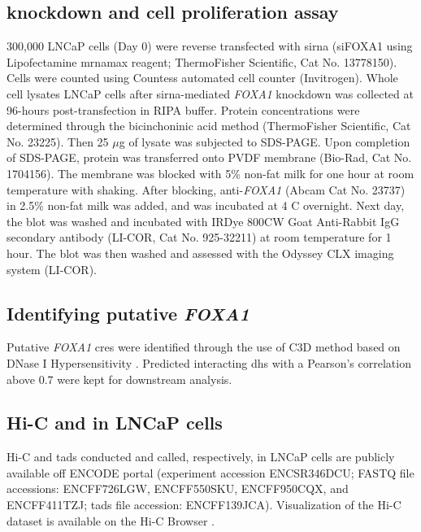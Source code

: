 \subsection{ knockdown and cell proliferation assay}

300,000 LNCaP cells (Day 0) were reverse transfected with \gls{sirna} (siFOXA1 using Lipofectamine \gls{mrna}max reagent; ThermoFisher Scientific, Cat No. 13778150).
Cells were counted using Countess automated cell counter (Invitrogen).
Whole cell lysates LNCaP cells after \gls{sirna}-mediated \emph{FOXA1} knockdown was collected at 96-hours post-transfection in RIPA buffer.
Protein concentrations were determined through the bicinchoninic acid method (ThermoFisher Scientific, Cat No. 23225).
Then 25 $\mu$g of lysate was subjected to SDS-PAGE.
Upon completion of SDS-PAGE, protein was transferred onto PVDF membrane (Bio-Rad, Cat No. 1704156).
The membrane was blocked with 5\% non-fat milk for one hour at room temperature with shaking.
After blocking, anti-\emph{FOXA1} (Abcam Cat No. 23737) in 2.5\% non-fat milk was added, and was incubated at 4 \textdegree C overnight.
Next day, the blot was washed and incubated with IRDye 800CW Goat Anti-Rabbit IgG secondary antibody (LI-COR, Cat No. 925-32211) at room temperature for 1 hour.
The blot was then washed and assessed with the Odyssey CLX imaging system (LI-COR).

\subsection{Identifying putative \emph{FOXA1} }

Putative \emph{FOXA1} \glspl{cre} were identified through the use of C3D method based on DNase I Hypersensitivity \cite{mehdiC3DToolPredict2019}.
Predicted interacting \gls{dhs} with a Pearson's correlation above 0.7 \cite{thurmanAccessibleChromatinLandscape2012} were kept for downstream analysis.

\subsection{Hi-C and  in LNCaP cells}

Hi-C and \glspl{tad} conducted and called, respectively, in LNCaP cells are publicly available off ENCODE portal (experiment accession ENCSR346DCU; FASTQ file accessions: ENCFF726LGW, ENCFF550SKU, ENCFF950CQX, and ENCFF411TZJ; \glspl{tad} file accession: ENCFF139JCA).
Visualization of the Hi-C dataset is available on the Hi-C Browser \cite{wang3DGenomeBrowser2018}.

